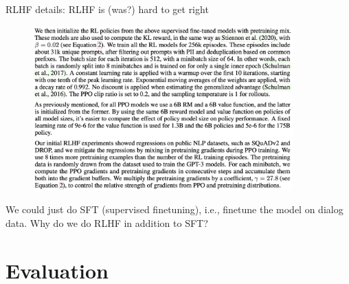 \begin{vbframe}{RLHF details: RLHF is (was?) hard to get right}


\begin{figure}
\centering
\includegraphics[width = 10cm]{figure/rlhfdetails.png}
\end{figure}



\vfill

\end{vbframe}

\begin{vbframe}{}

		\ques
We could just do SFT (supervised finetuning), i.e.,
finetune the model
		on dialog data. Why do we do RLHF in
                addition to SFT?

\end{vbframe}





\section{Evaluation}






